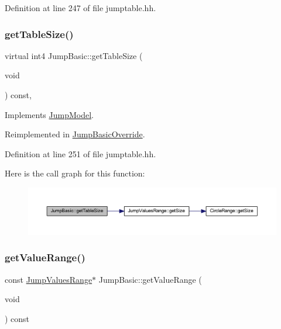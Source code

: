 Definition at line 247 of file jumptable.\+hh.

\mbox{\label{class_jump_basic_abef7f04911739ec301f393f072a1c9c5}} 
\subsubsection{\texorpdfstring{getTableSize()}{getTableSize()}}
{\footnotesize\ttfamily virtual int4 Jump\+Basic\+::get\+Table\+Size (\begin{DoxyParamCaption}\item[{void}]{ }\end{DoxyParamCaption}) const\hspace{0.3cm}{\ttfamily [inline]}, {\ttfamily [virtual]}}



Implements \mbox{\hyperlink{class_jump_model_acbc757d5fe05e9e8cb15697ddc73f367}{Jump\+Model}}.



Reimplemented in \mbox{\hyperlink{class_jump_basic_override_a49b889abc5b5f57fe22b6cbc17e03f64}{Jump\+Basic\+Override}}.



Definition at line 251 of file jumptable.\+hh.

Here is the call graph for this function\+:
\nopagebreak
\begin{figure}[H]
\begin{center}
\leavevmode
\includegraphics[width=350pt]{class_jump_basic_abef7f04911739ec301f393f072a1c9c5_cgraph}
\end{center}
\end{figure}
\mbox{\label{class_jump_basic_afcd2c65a719d7d429f583793b25e781c}} 
\subsubsection{\texorpdfstring{getValueRange()}{getValueRange()}}
{\footnotesize\ttfamily const \mbox{\hyperlink{class_jump_values_range}{Jump\+Values\+Range}}$\ast$ Jump\+Basic\+::get\+Value\+Range (\begin{DoxyParamCaption}\item[{void}]{ }\end{DoxyParamCaption}) const\hspace{0.3cm}{\ttfamily [inline]}}



